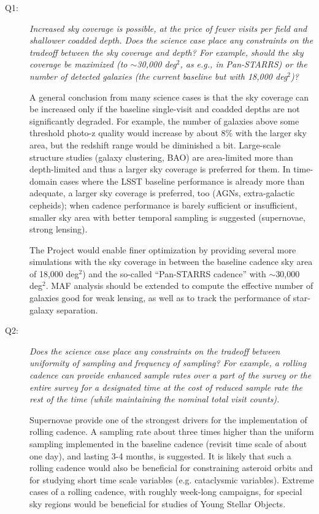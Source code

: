 \begin{description}

\item[Q1:] {\it Increased sky coverage is possible, at the price of fewer visits per field and shallower
coadded depth.  Does the science case place any constraints on the
tradeoff between the sky coverage and depth? For example, should
the sky coverage be maximized (to $\sim$30,000 deg$^2$, as e.g., in
Pan-STARRS) or the number of detected galaxies (the current baseline but
with 18,000 deg$^2$)?}

A general conclusion from many science cases is that the sky coverage
can be increased only if the baseline single-visit and coadded depths
are not significantly degraded. For example, the number of galaxies above
some threshold photo-z quality would increase by about 8\% with the larger
sky area, but the redshift range would be diminished a bit. Large-scale
structure studies (\eg galaxy clustering, BAO) are
area-limited more than depth-limited and thus a larger sky coverage is
preferred for them. In time-domain cases where the LSST baseline performance is already
more than adequate, a larger sky coverage is preferred, too (AGNs,
extra-galactic cepheids); when cadence performance is barely sufficient
or insufficient, smaller sky area with better temporal sampling is suggested
(supernovae, strong lensing).

The Project would enable finer optimization by providing several more
simulations with the sky coverage in between the baseline cadence sky
area of 18,000 deg$^2$) and the so-called ``Pan-STARRS cadence'' with
$\sim$30,000 deg$^2$. MAF analysis should be extended to compute the
effective number of galaxies good for weak lensing, as well as to track
the performance of star-galaxy separation.


\item[Q2:] {\it Does the science case place any constraints on the
tradeoff between uniformity of sampling and frequency of  sampling? For
example, a rolling cadence can provide enhanced sample rates over a part
of the survey or the entire survey for a designated time at the cost of
reduced sample rate the rest of the time (while maintaining the nominal
total visit counts).}

Supernovae provide one of the strongest drivers for the implementation of
rolling cadence. A sampling rate about three times higher than the
uniform sampling implemented in the baseline cadence (revisit time scale of
about one day), and lasting 3-4 months, is suggested. It is likely that
such a rolling cadence would also be beneficial for constraining
asteroid orbits and for studying short time scale variables (e.g.
cataclysmic variables). Extreme cases of a rolling cadence, with roughly
week-long campaigns, for special sky regions would be beneficial for
studies of Young Stellar Objects.


\end{description}
